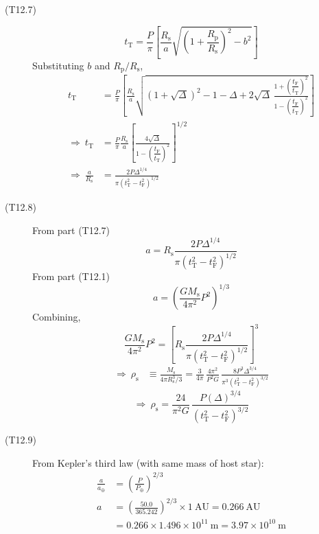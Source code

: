 \begin{description}
\item[(T12.7)]
\[
t_{\mathrm{T}} = \frac{P}{\pi}\left[\frac{R_{\mathrm{s}}}{a}
  \sqrt{\left(1 + \frac{R_{\mathrm{p}}}{R_{\mathrm{s}}}\right)^2 - b^2}
  \right] \tag*{(1.0)}
\]
Substituting $b$ and $R_{\mathrm{p}}/R_{\mathrm{s}}$,
\begin{align*}
t_{\mathrm{T}} &= \frac{P}{\pi}\left[\frac{R_{\mathrm{s}}}{a}
  \sqrt{(1 + \sqrt{\Delta})^2 - 1 - \Delta + 2\sqrt{\Delta}\,
   \frac{1 + \left(\dfrac{t_{\mathrm{F}}}{t_{\mathrm{T}}}\right)^2}
        {1 - \left(\dfrac{t_{\mathrm{F}}}{t_{\mathrm{T}}}\right)^2}}
  \right]\\
\Rightarrow\ t_{\mathrm{T}} &= \frac{P}{\pi}\frac{R_{\mathrm{s}}}{a}
  \left[\frac{4\sqrt{\Delta}}
        {1 - \left(\dfrac{t_{\mathrm{F}}}{t_{\mathrm{T}}}\right)^2}
  \right]^{1/2}\\
\Rightarrow\ \frac{a}{R_{\mathrm{s}}}
 &= \frac{2P\Delta^{1/4}}
         {\pi(t_{\mathrm{T}}^2 - t_{\mathrm{F}}^2)^{1/2}} \tag*{(2.0)}
\end{align*}

\item[(T12.8)] From part (T12.7)
\[
a = R_{\mathrm{s}}\frac{2P\Delta^{1/4}}
    {\pi(t_{\mathrm{T}}^2 - t_{\mathrm{F}}^2)^{1/2}}
\]
From part (T12.1)
\[
a = \left(\frac{GM_{\mathrm{s}}}{4\pi^2}P^2\right)^{1/3}
\]
Combining,
\[
\frac{GM_{\mathrm{s}}}{4\pi^2}P^2
 = \left[R_{\mathrm{s}}\frac{2P\Delta^{1/4}}
   {\pi(t_{\mathrm{T}}^2 - t_{\mathrm{F}}^2)^{1/2}}\right]^3 \tag*{(3.0)}
\]
\begin{align*}
\Rightarrow\ \rho_{\mathrm{s}}
 &\equiv \frac{M_{\mathrm{s}}}{4\pi R_{\mathrm{s}}^3/3}
 = \frac{3}{4\pi}\,\frac{4\pi^2}{P^2G}\,
   \frac{8P^3\Delta^{3/4}}
        {\pi^3(t_{\mathrm{T}}^2 - t_{\mathrm{F}}^2)^{3/2}} \tag*{(2.0)}
\end{align*}
\[
\Rightarrow\ \boxed{\rho_{\mathrm{s}}
 = \frac{24}{\pi^2 G}\,
   \frac{P(\Delta)^{3/4}}
        {(t_{\mathrm{T}}^2 - t_{\mathrm{F}}^2)^{3/2}}} \tag*{(1.0)}
\]

\item[(T12.9)] From Kepler's third law (with same mass of host star):
\begin{align*}
\frac{a}{a_\oplus} &= \left(\frac{P}{P_\oplus}\right)^{2/3} \tag*{(1.0)}\\
a &= \left(\frac{50.0}{365.242}\right)^{2/3} \times 1\ \mathrm{AU}
 = \boxed{0.266\ \mathrm{AU}} \tag*{(0.5)}\\
&= 0.266 \times 1.496 \times 10^{11}\ \mathrm{m}
 = \boxed{3.97 \times 10^{10}\ \mathrm{m}} \tag*{(0.5)}
\end{align*}


\end{description}
